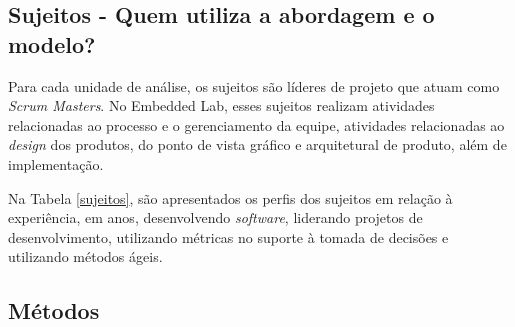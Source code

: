 \begin{longtable}
\end{longtable}

\subsection{Sujeitos - Quem utiliza a abordagem e o modelo?}
\label{estudodecaso:design:sujeitos}

Para cada unidade de análise, os sujeitos são líderes de projeto que atuam como \textit{Scrum Masters}. No Embedded Lab, esses sujeitos realizam atividades relacionadas ao processo e o gerenciamento da equipe, atividades relacionadas ao \textit{design} dos produtos, do ponto de vista gráfico e arquitetural de produto, além de implementação.

Na Tabela \ref{sujeitos}, são apresentados os perfis dos sujeitos em relação à experiência, em anos, desenvolvendo \textit{software}, liderando projetos de desenvolvimento, utilizando métricas no suporte à tomada de decisões e utilizando métodos ágeis.

\begin{table}[ht!]
\centering
\caption{Perfis dos Sujeitos}
\label{sujeitos}
\end{table}

\subsection{Métodos}
\label{estudodecaso:design:metodos}

